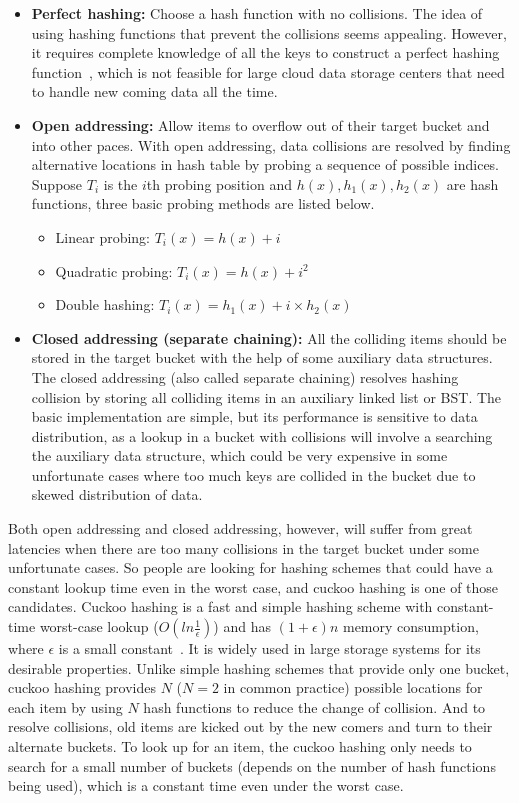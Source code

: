 \documentclass[12pt,conference,compsoc]{IEEEtran}
\begin{document}
\begin{itemize}
    \item \textbf{Perfect hashing:} Choose a hash function with no collisions. The idea of using hashing functions that prevent the collisions seems appealing. However, it requires complete knowledge of all the keys to construct a perfect hashing function~\cite{perfectHashing}, which is not feasible for large cloud data storage centers that need to handle new coming data all the time.

    \item \textbf{Open addressing:} Allow items to overflow out of their target bucket and into other paces. With open addressing, data collisions are resolved by finding alternative locations in hash table by probing a sequence of possible indices. Suppose $T_i$ is the $i$th probing position and $h(x), h_1(x), h_2(x)$ are hash functions, three basic probing methods are listed below.
    \begin{itemize}
        \item Linear probing: $T_i(x)=h(x)+i$
        \item Quadratic probing: $T_i(x)=h(x)+i^2$
        \item Double hashing: $T_i(x)=h_1(x)+i\times h_2(x)$
    \end{itemize}

    \item \textbf{Closed addressing (separate chaining):} All the colliding items should be stored in the target bucket with the help of some auxiliary data structures. The closed addressing (also called separate chaining) resolves hashing collision by storing all colliding items in an auxiliary linked list or BST. The basic implementation are simple, but its performance is sensitive to data distribution, as a lookup in a bucket with collisions will involve a searching the auxiliary data structure, which could be very expensive in some unfortunate cases where too much keys are collided in the bucket due to skewed distribution of data.
\end{itemize}


Both open addressing and closed addressing, however, will suffer from great latencies when there are too many collisions in the target bucket under some unfortunate cases. So people are looking for hashing schemes that could have a constant lookup time even in the worst case, and cuckoo hashing is one of those candidates. Cuckoo hashing is a fast and simple hashing scheme with constant-time worst-case lookup ($O(ln\frac{1}{\epsilon})$) and has $(1+\epsilon)n$ memory consumption, where $\epsilon$ is a small constant~\cite{cuckoo}. It is widely used in large storage systems for its desirable properties. Unlike simple hashing schemes that provide only one bucket, cuckoo hashing provides $N$ ($N=2$ in common practice) possible locations for each item by using $N$ hash functions to reduce the change of collision. And to resolve collisions, old items are kicked out by the new comers and turn to their alternate buckets. To look up for an item, the cuckoo hashing only needs to search for a small number of buckets (depends on the number of hash functions being used), which is a constant time even under the worst case.
\end{document}
